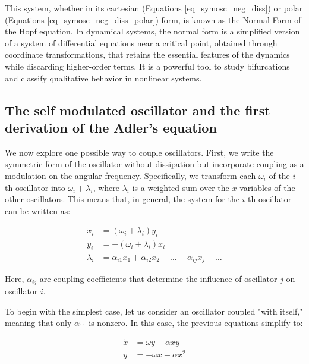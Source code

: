 \documentclass{article}
\begin{document}
This system, whether in its cartesian (Equations {\ref{eq_symosc_neg_diss}}) or polar (Equations \ref{eq_symosc_neg_diss_polar}) form, is known as the Normal Form of the Hopf equation. 
In dynamical systems, the normal form is a simplified version of a system of differential equations near a critical point, obtained through coordinate transformations, that retains the essential features of the dynamics while discarding higher-order terms. 
It is a powerful tool to study bifurcations and classify qualitative behavior in nonlinear systems.



\subsection{The self modulated oscillator and the first derivation of the Adler's equation}

We now explore one possible way to couple oscillators. 
First, we write the symmetric form of the oscillator without dissipation but incorporate coupling as a modulation on the angular frequency. 
Specifically, we transform each $\omega_i$ of the $i$-th oscillator into $\omega_i + \lambda_i$, where $\lambda_i$ is a weighted sum over the $x$ variables of the other oscillators. 
This means that, in general, the system for the $i$-th oscillator can be written as:

\begin{subequations} \label{eq_coupled_oscillators}
\begin{align}
    \dot{x}_i & = (\omega_i + \lambda_i) y_i \\
    \dot{y}_i & = -(\omega_i + \lambda_i) x_i \\
    \lambda_i & = \alpha_{i1} x_1 + \alpha_{i2} x_2 + \dots + \alpha_{ij} x_j + \dots
\end{align}
\end{subequations}

Here, $\alpha_{ij}$ are coupling coefficients that determine the influence of oscillator $j$ on oscillator $i$.

To begin with the simplest case, let us consider an oscillator coupled "with itself," meaning that only $\alpha_{11}$ is nonzero. In this case, the previous equations simplify to:

\begin{subequations} \label{eq_self_coupled_oscillator}
\begin{align}
    \dot{x} & = \omega y + \alpha xy \\
    \dot{y} & = -\omega x - \alpha x^2
\end{align}
\end{subequations}
\end{document}
